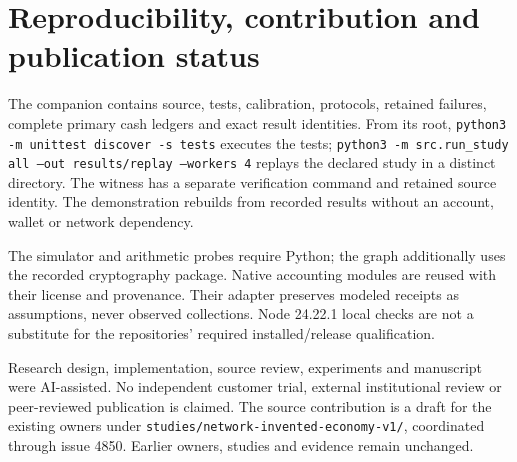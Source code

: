 \documentclass[11pt,letterpaper]{article}
\begin{document}
\section*{Reproducibility, contribution and publication status}

The companion contains source, tests, calibration, protocols, retained failures,
complete primary cash ledgers and exact result identities. From its root,
\texttt{python3 -m unittest discover -s tests} executes the tests;
\texttt{python3 -m src.run\_study all --out results/replay --workers 4}
replays the declared study in a distinct directory. The witness has a separate
verification command and retained source identity. The demonstration rebuilds
from recorded results without an account, wallet or network dependency.

The simulator and arithmetic probes require Python; the graph additionally uses
the recorded cryptography package. Native accounting modules are reused with
their license and provenance. Their adapter preserves modeled receipts as
assumptions, never observed collections. Node 24.22.1 local checks are not a
substitute for the repositories' required installed/release qualification.

Research design, implementation, source review, experiments and manuscript were
AI-assisted. No independent customer trial, external institutional review or
peer-reviewed publication is claimed. The source contribution is a draft for
the existing owners under \texttt{studies/network-invented-economy-v1/}, coordinated
through issue 4850. Earlier owners, studies and evidence remain unchanged.

\begingroup
\small
\setlength{\bibsep}{5pt}


\endgroup
\end{document}
